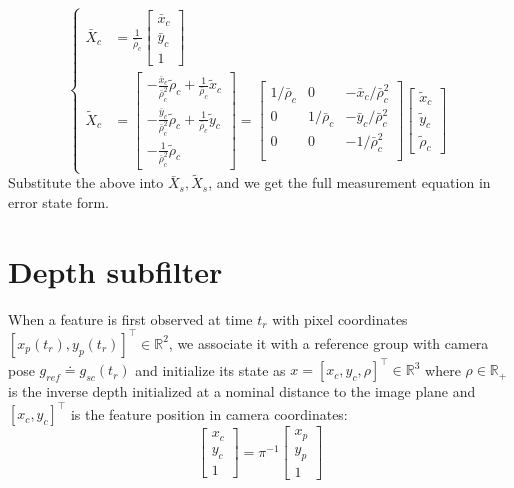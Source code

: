 \documentclass[letter,10pt]{article}
\newcommand{\real}{\mathbb{R}}
\begin{document}
\begin{equation}
\begin{cases}
\bar X_c &=
\frac{1}{\bar \rho_c}
\begin{bmatrix}
    \bar x_c\\
    \bar y_c\\
    1
\end{bmatrix} \\
\tilde X_c &=
\begin{bmatrix}
-\frac{\bar x_c}{\bar \rho_c^2} \tilde\rho_c + \frac{1}{\bar \rho_c} \tilde x_c \\
-\frac{\bar y_c}{\bar \rho_c^2} \tilde\rho_c + \frac{1}{\bar \rho_c} \tilde y_c \\
-\frac{1}{\bar \rho_c^2} \tilde \rho_c
\end{bmatrix} 
=
\begin{bmatrix}
    1/\bar\rho_c & 0 & -\bar x_c / \bar\rho_c^2\\
    0 & 1/\bar\rho_c & -\bar y_c / \bar\rho_c^2\\
    0 & 0 & -1 / \bar\rho_c^2\\
\end{bmatrix}
\begin{bmatrix}
    \tilde x_c \\
    \tilde y_c \\
    \tilde \rho_c
\end{bmatrix}
\end{cases}
\end{equation}
Substitute the above into $\bar X_s, \tilde X_s$, and we get the full measurement equation in error state form.







\section{Depth subfilter}
\label{sect-depth}
When a feature is first observed at time $t_r$ with pixel coordinates $[x_p(t_r) , y_p(t_r)]^\top\in\real^2$, we associate it with a reference group with camera pose $g_{ref}\doteq g_{sc}(t_r)$ and initialize its state as $x=[x_c, y_c, \rho]^\top \in \real^3$ where $\rho \in \real_+$ is the inverse depth initialized at a nominal distance to the image plane and $[x_c, y_c]^\top$ is the feature position in camera coordinates:
\begin{equation}
\begin{bmatrix}
x_c\\
y_c\\
1
\end{bmatrix}
= \pi^{-1}
\begin{bmatrix}
x_p\\
y_p\\
1
\end{bmatrix}
\end{equation}
\end{document}
